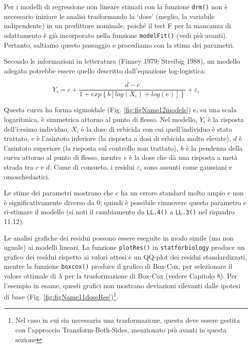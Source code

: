 \documentclass[
  12pt,
]{book}
\begin{document}
Per i modelli di regressione non lineare stimati con la funzione \texttt{drm()} non è necessario iniziare le analisi trasformando la `dose' (meglio, la variabile indipendente) in un predittore nominale, poiché il test F per la mancanza di adattamento è già incorporato nella funzione \texttt{modelFit()} (vedi più avanti). Pertanto, saltiamo questo passaggio e procediamo con la stima dei parametri.

Secondo le informazioni in letteratura (Finney 1979; Streibig 1988), un modello adegato potrebbe essere quello descritto dall'equazione log-logistica:

\[Y_i = c + \frac{d - c}{1+exp\left\{ b \left[ log\left(X_i \right) + log \left(e \right) \right]\right\}}  + \varepsilon_i\]

Questa curva ha forma sigmoidale (Fig. \ref{fig:figName12models}) e, su una scala logaritmica, è simmetrica attorno al punto di flesso. Nel modello, \(Y_i\) è la risposta dell'i-esimo individuo, \(X_i\) è la dose di erbicida con cui quell'individuo è stato trattato, \(c\) è l'asintoto inferiore (la risposta a dosi di erbicida molto elevate), \(d\) è l'asintoto superiore (la risposta sul controllo non trattato), \(b\) è la pendenza della curva attorno al punto di flesso, mentre \(e\) è la dose che dà una risposta a metà strada tra \(c\) e \(d\). Come di consueto, i residui \(\varepsilon_i\) sono assunti come gaussiani e omoschedastici.

Le stime dei parametri mostrano che \(c\) ha un errore standard molto ampio e non è significativamente diverso da 0; quindi è possibile rimuovere questo parametro e ri-stimare il modello (si noti il cambiamento da \texttt{LL.4()} a \texttt{LL.3()} nel riquadro 11.12).

Le analisi grafiche dei residui possono essere eseguite in modo simile (ma non uguale) ai modelli lineari. La funzione \texttt{plotRes()} in \texttt{statforbiology} produce un grafico dei residui rispetto ai valori attesi e un QQ-plot dei residui standardizzati, mentre la funzione \texttt{boxcox()} produce il grafico di Box-Cox, per selezionare il valore ottimale di \(\lambda\) per la trasformazione di Box-Cox (vedere Capitolo 8). Per l'esempio in esame, questi grafici non mostrano deviazioni rilevanti dalle ipotesi di base (Fig. \ref{fig:figName11doseRes})\footnote{Nel caso in cui sia necessaria una trasformazione, questa deve essere gestita con l'approccio Transform-Both-Sides, menzionato più avanti in questa sezione}.

\vspace{12pt}
\small
\end{document}
